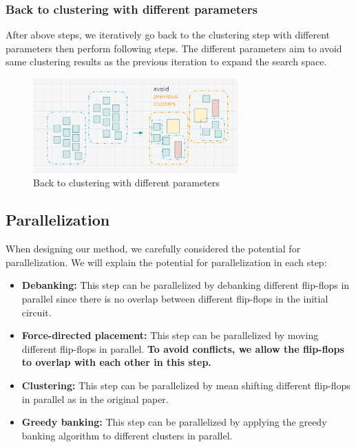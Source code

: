 \documentclass[12pt]{article}
\begin{document}
\subsubsection{Back to clustering with different parameters}

After above steps, we iteratively go back to the clustering step with different parameters then perform following steps. The different parameters aim to avoid same clustering results as the previous iteration to expand the search space.

\begin{figure}[htbp]
    \centering
    \includegraphics[width=0.7\textwidth]{back.png}
    \caption{Back to clustering with different parameters}
    \label{fig:back}
\end{figure}
\FloatBarrier

\subsection{Parallelization}

When designing our method, we carefully considered the potential for parallelization. We will explain the potential for parallelization in each step:

\begin{itemize}
    \item \textbf{Debanking:} This step can be parallelized by debanking different flip-flops in parallel since there is no overlap between different flip-flops in the initial circuit.
    \item \textbf{Force-directed placement:} This step can be parallelized by moving different flip-flops in parallel. \textbf{To avoid conflicts, we allow the flip-flops to overlap with each other in this step.}
    \item \textbf{Clustering:} This step can be parallelized by mean shifting different flip-flops in parallel as in the original paper.
    \item \textbf{Greedy banking:} This step can be parallelized by applying the greedy banking algorithm to different clusters in parallel.
\end{itemize}
\end{document}
